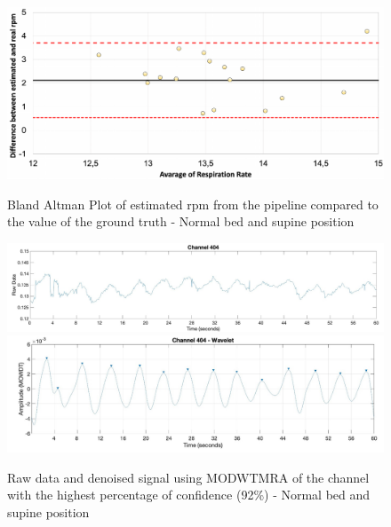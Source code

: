 \begin{figure}[p]
  \centering
  \includegraphics[width=\textwidth]{img/balnd1.pdf}

  \caption{Bland Altman Plot of estimated rpm from the pipeline compared to the value of the ground truth - Normal bed and supine position}
  \label{fig:baln1}
  \vspace{1.5cm}
  \includegraphics[width=\textwidth]{img/404.jpg}
  \includegraphics[width=\textwidth]{img/404_wave.jpg}
\caption{Raw data and denoised signal using MODWTMRA of the channel with the highest percentage of confidence (92\%) - Normal bed and supine position}
  \label{fig:rec}
\end{figure}
